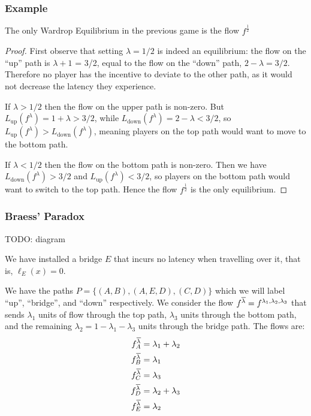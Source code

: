 \subsubsection{Example}

\begin{claim}
	The only Wardrop Equilibrium in the previous game is the flow
	$f^\frac{1}{2}$
\end{claim}
\begin{proof}
	First observe that setting $\lambda = 1/2$ is indeed an equilibrium: the
	flow on the ``up'' path is $\lambda + 1$ = 3/2, equal to the flow on the
	``down'' path, $2 - \lambda = 3/2$. Therefore no player has the incentive
	to deviate to the other path, as it would not decrease the latency they
	experience.

	If $\lambda > 1/2$ then the flow on the upper path is non-zero. But
	$L_\text{up}(f^\lambda) = 1 + \lambda > 3/2$, while
	$L_\text{down}(f^\lambda) = 2 - \lambda < 3/2$, so $L_\text{up}(f^\lambda)
	> L_\text{down}(f^\lambda)$, meaning players on the top path would want to
	move to the bottom path.

	If $\lambda < 1/2$ then the flow on the bottom path is non-zero. Then we
	have $L_\text{down}(f^\lambda) > 3/2$ and $L_\text{up}(f^\lambda) < 3/2$,
	so players on the bottom path would want to switch to the top path. Hence
	the flow $f^\frac{1}{2}$ is the only equilibrium.
\end{proof}

\subsubsection{Braess' Paradox}

TODO: diagram

We have installed a bridge $E$ that incurs no latency when travelling over it,
that is, $\ell_E(x) = 0$.

We have the paths $P = \{ (A,B), (A,E,D), (C,D) \}$ which we will label ``up'',
``bridge'', and ``down'' respectively. We consider the flow $f^{\overline{\lambda}}
= f^{\lambda_1, \lambda_2, \lambda_3}$ that sends $\lambda_1$ units of flow
through the top path, $\lambda_3$ units through the bottom path, and the
remaining $\lambda_2 = 1 - \lambda_1 - \lambda_3$ units through the bridge
path. The flows are:
\begin{equation*}
	\begin{split}
		f^{\overline{\lambda}}_A & = \lambda_1 + \lambda_2 \\
		f^{\overline{\lambda}}_B & = \lambda_1 \\
		f^{\overline{\lambda}}_C & = \lambda_3 \\
		f^{\overline{\lambda}}_D & = \lambda_2 + \lambda_3 \\
		f^{\overline{\lambda}}_E & = \lambda_2 \\
	\end{split}
\end{equation*}

